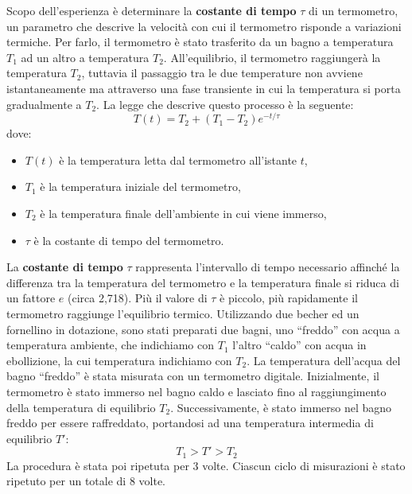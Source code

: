 Scopo dell'esperienza è determinare la \textbf{costante di tempo} \( \tau \) di un termometro, 
un parametro che descrive la velocità con cui il termometro risponde a variazioni termiche. 
Per farlo, il termometro è stato trasferito da un bagno a temperatura $T_1$ ad un altro a temperatura $T_2$. All'equilibrio, il termometro raggiungerà la temperatura $T_2$, tuttavia il passaggio tra le due temperature non avviene istantaneamente ma attraverso una fase transiente in cui la temperatura si porta gradualmente a $T_2$. La legge che descrive questo processo è la seguente:
\begin{equation}
    T(t) = T_2 + (T_1 - T_2) e^{-t/\tau}
\end{equation}
dove:
\begin{itemize}
    \item \( T(t) \) è la temperatura letta dal termometro all'istante \( t \),
    \item \( T_1 \) è la temperatura iniziale del termometro,
    \item \( T_2 \) è la temperatura finale dell’ambiente in cui viene immerso,
    \item \( \tau \) è la costante di tempo del termometro.
\end{itemize}
La \textbf{costante di tempo} \( \tau \) rappresenta l'intervallo di tempo necessario affinché la differenza tra la temperatura del termometro e la temperatura finale si riduca di un fattore \( e \) (circa 2,718). Più il valore di \( \tau \) è piccolo, più rapidamente il termometro raggiunge l'equilibrio termico. Utilizzando due becher ed un fornellino in dotazione, sono stati preparati due bagni, uno “freddo” con acqua a temperatura ambiente, che indichiamo con $T_1$ l’altro “caldo” con acqua in ebollizione, la cui temperatura indichiamo con $T_2$. La temperatura dell’acqua del bagno “freddo” è stata misurata con un termometro digitale. Inizialmente, il termometro è stato immerso nel bagno caldo e lasciato fino al raggiungimento della temperatura di equilibrio $T_2$. Successivamente, è stato immerso nel bagno freddo per essere raffreddato, portandosi ad una temperatura intermedia di equilibrio $T'$:
\begin{equation}
    T_1 > T' > T_2
\end{equation}
La procedura è stata poi ripetuta per 3 volte. Ciascun ciclo di misurazioni è stato ripetuto per un totale di 8 volte.
